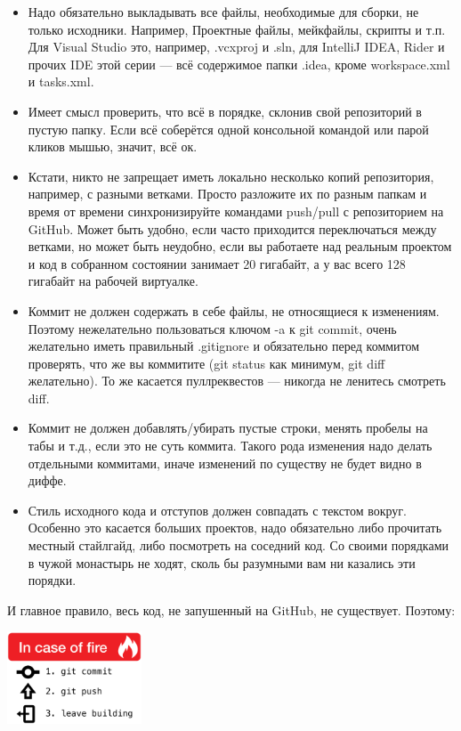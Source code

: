 \documentclass{../text-style}
\begin{document}
\begin{itemize}
    \item Надо обязательно выкладывать все файлы, необходимые для сборки, не только исходники. Например, Проектные файлы, мейкфайлы, скрипты и т.п. Для Visual Studio это, например, .vcxproj и .sln, для IntelliJ IDEA, Rider и прочих IDE этой серии --- всё содержимое папки .idea, кроме workspace.xml и tasks.xml.
    \item Имеет смысл проверить, что всё в порядке, склонив свой репозиторий в пустую папку. Если всё соберётся одной консольной командой или парой кликов мышью, значит, всё ок.
    \item Кстати, никто не запрещает иметь локально несколько копий репозитория, например, с разными ветками. Просто разложите их по разным папкам и время от времени синхронизируйте командами push/pull с репозиторием на GitHub. Может быть удобно, если часто приходится переключаться между ветками, но может быть неудобно, если вы работаете над реальным проектом и код в собранном состоянии занимает 20 гигабайт, а у вас всего 128 гигабайт на рабочей виртуалке.
    \item Коммит не должен содержать в себе файлы, не относящиеся к изменениям. Поэтому нежелательно пользоваться ключом -a к git commit, очень желательно иметь правильный .gitignore и обязательно перед коммитом проверять, что же вы коммитите (git status как минимум, git diff желательно). То же касается пуллреквестов --- никогда не ленитесь смотреть diff.
    \item Коммит не должен добавлять/убирать пустые строки, менять пробелы на табы и т.д., если это не суть коммита. Такого рода изменения надо делать отдельными коммитами, иначе изменений по существу не будет видно в диффе.
    \item Стиль исходного кода и отступов должен совпадать с текстом вокруг. Особенно это касается больших проектов, надо обязательно либо прочитать местный стайлгайд, либо посмотреть на соседний код. Со своими порядками в чужой монастырь не ходят, сколь бы разумными вам ни казались эти порядки.
\end{itemize}

И главное правило, весь код, не запушенный на GitHub, не существует. Поэтому:

\begin{center}
    \includegraphics[width=0.3\textwidth]{inCaseOfFire.png}
\end{center}
\end{document}
